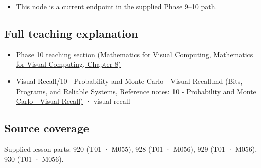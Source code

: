 \begin{itemize}
\tightlist
\item
  This node is a current endpoint in the supplied Phase 9--10 path.
\end{itemize}

\subsection{Full teaching explanation}\label{appendix-f0437ea55a47-full-teaching-explanation}

\begin{itemize}
\tightlist
\item
  \href{../02-Mathematics-for-Visual-Computing/main.pdf\#nameddest=02-foundations-ii-ch024-waiting-times-event-counts-and-covariance-geometry}{Phase 10 teaching section (Mathematics for Visual Computing, Mathematics for Visual Computing, Chapter 8)}
\item
  \href{../01-Bits-Programs-and-Reliable-Systems/main.pdf\#nameddest=appendix-cb5af353ef77}{Visual Recall/10 - Probability and Monte Carlo - Visual Recall.md (Bits, Programs, and Reliable Systems, Reference notes: 10 - Probability and Monte Carlo - Visual Recall)} · visual recall
\end{itemize}

\subsection{Source coverage}\label{appendix-f0437ea55a47-source-coverage}

Supplied lesson parts: 920 (T01 · M055), 928 (T01 · M056), 929 (T01 · M056), 930 (T01 · M056).
